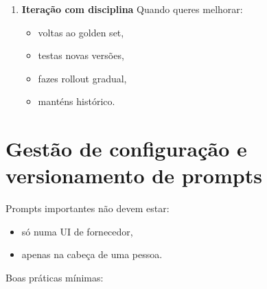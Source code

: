 \begin{enumerate}[leftmargin=*]
\begin{itemize}[leftmargin=*]
\item pedidos e respostas estritamente necessários, com campos sensíveis excluídos ou protegidos,
\item métricas de negócio,
\item feedback dos utilizadores.
\end{itemize}
\item \textbf{Iteração com disciplina}
Quando queres melhorar:
\begin{itemize}[leftmargin=*]
\item voltas ao golden set,
\item testas novas versões,
\item fazes rollout gradual,
\item manténs histórico.
\end{itemize}
\end{enumerate}

\section{Gestão de configuração e versionamento de prompts}

Prompts importantes não devem estar:

\begin{itemize}[leftmargin=*]
\item só numa UI de fornecedor,
\item apenas na cabeça de uma pessoa.
\end{itemize}

Boas práticas mínimas:

